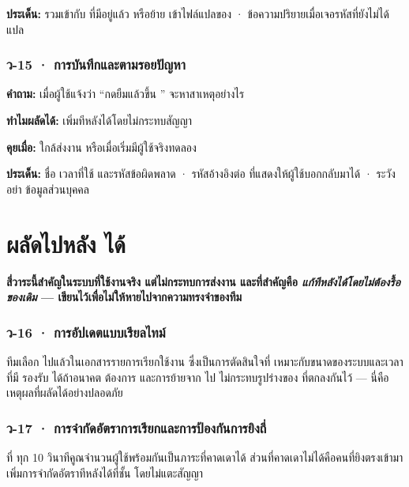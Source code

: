 \textbf{ประเด็น:} รวมเข้ากับ  ที่มีอยู่แล้ว หรือย้าย
เข้าไฟล์แปลของ  · ข้อความปริยายเมื่อเจอรหัสที่ยังไม่ได้แปล

\section{ว-15 · การบันทึกและตามรอยปัญหา}

\textbf{คำถาม:} เมื่อผู้ใช้แจ้งว่า ``กดยืมแล้วขึ้น '' จะหาสาเหตุอย่างไร

\textbf{ทำไมผลัดได้:} เพิ่มทีหลังได้โดยไม่กระทบสัญญา

\textbf{คุยเมื่อ:} ใกล้ส่งงาน หรือเมื่อเริ่มมีผู้ใช้จริงทดลอง

\textbf{ประเด็น:}  ชื่อ  เวลาที่ใช้ และรหัสข้อผิดพลาด ·
รหัสอ้างอิงต่อ  ที่แสดงให้ผู้ใช้บอกกลับมาได้ · ระวังอย่า 
ข้อมูลส่วนบุคคล

\clearpage

\part{\pthree{} ผลัดไปหลัง  ได้}

\textbf{สี่วาระนี้สำคัญในระบบที่ใช้งานจริง แต่ไม่กระทบการส่งงาน และที่สำคัญคือ
\emph{แก้ทีหลังได้โดยไม่ต้องรื้อของเดิม} --- เขียนไว้เพื่อไม่ให้หายไปจากความทรงจำของทีม}

\section{ว-16 · การอัปเดตแบบเรียลไทม์}

ทีมเลือก  ไปแล้วในเอกสารรายการเรียกใช้งาน ซึ่งเป็นการตัดสินใจที่
เหมาะกับขนาดของระบบและเวลาที่มี  รองรับ  ได้ถ้าอนาคต
ต้องการ และการย้ายจาก  ไป  ไม่กระทบรูปร่างของ
 ที่ตกลงกันไว้ --- นี่คือเหตุผลที่ผลัดได้อย่างปลอดภัย

\section{ว-17 · การจำกัดอัตราการเรียกและการป้องกันการยิงถี่}

 ที่  ทุก 10 วินาทีคูณจำนวนผู้ใช้พร้อมกันเป็นภาระที่คาดเดาได้
ส่วนที่คาดเดาไม่ได้คือคนที่ยิงตรงเข้ามา เพิ่มการจำกัดอัตราทีหลังได้ที่ชั้น
 โดยไม่แตะสัญญา

